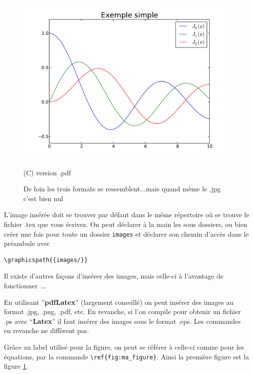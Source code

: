 \begin{figure}[h]
\begin{minipage}[b]{.33\linewidth}
  \centering
 \centerline{\includegraphics[width=1.\textwidth]{example_simple_pdf}}
  \vspace{0.1cm}
  \centerline{(C) version .pdf}\medskip
\end{minipage}%
\caption{De loin les trois formats se ressemblent...mais quand m\^eme le .jpg c'est bien nul}
\label{fig:ma_figure}
\end{figure}
L'image insérée doit se trouver par défaut dans le même répertoire où se trouve le fichier .tex 
que vous écrivez. On peut d\'eclarer \`a la main les sous dossiers, ou bien cr\'eer une fois
pour toute un dossier \lstinline+images+ et d\'eclarer son chemin d'acc\`es dans le préambule
avec
\begin{lstlisting}
\graphicspath{{images/}} 
\end{lstlisting}

Il existe d'autres façons d'insérer des images, mais celle-ci à l'avantage de fonctionner~\ldots


En utilisant ''\textbf{pdfLatex}'' (largement conseillé)  on peut insérer des images au format .jpg, .png, 
.pdf, etc. En revanche, si l'on compile pour obtenir un fichier .ps avec ``\textbf{Latex}'' il 
faut insérer des images sous le format .eps. Les commandes en revanche ne diffèrent
 pas.

Grâce au label utilisé pour la figure, on peut se référer à celle-ci comme pour les équations,
 par la commande \lstinline+\ref{fig:ma_figure}+. Ainsi la première figure est la figure \ref{fig:ma_figure}.

